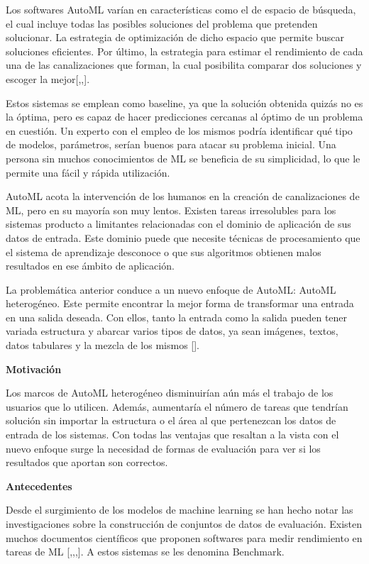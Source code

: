 Los softwares AutoML varían en características como el de espacio de búsqueda, el cual incluye todas las posibles soluciones del problema que pretenden solucionar. 
La estrategia de optimización de dicho espacio que permite buscar soluciones eficientes. Por último, la estrategia para estimar el rendimiento de cada una de las 
canalizaciones que forman, la cual posibilita comparar dos soluciones y escoger la mejor[\cite{33},\cite{37},\cite{52}].

Estos sistemas se emplean como baseline, ya que la solución obtenida quizás no es la óptima, pero es capaz de hacer predicciones cercanas al óptimo de un 
problema en cuestión. Un experto con el empleo de los mismos podría identificar qué tipo de modelos, parámetros, serían buenos para atacar su problema inicial. 
Una persona sin muchos conocimientos de ML se beneficia de su simplicidad, lo que le permite una fácil y rápida utilización.

AutoML acota la intervención de los humanos en la creación de canalizaciones de ML, pero en su mayoría son muy lentos. Existen tareas irresolubles para los 
sistemas producto a limitantes relacionadas con el dominio de aplicación de sus datos de entrada. Este dominio puede que necesite técnicas de procesamiento que el 
sistema de aprendizaje desconoce o que sus algoritmos obtienen malos resultados en ese ámbito de aplicación.

La problemática anterior conduce a un nuevo enfoque de AutoML: AutoML heterogéneo. Este permite encontrar la mejor forma de transformar una entrada en una 
salida deseada. Con ellos, tanto la entrada como la salida pueden tener variada estructura y abarcar varios tipos de datos, ya sean imágenes, textos, datos 
tabulares y la mezcla de los mismos [\cite{33}].

\begin{flushleft} 
{\Large { \textbf{Motivación} }}
\end{flushleft}
Los marcos de AutoML heterogéneo disminuirían aún más el trabajo de los usuarios que lo utilicen. Además, aumentaría el número de 
tareas que tendrían solución sin importar la estructura o el área al que pertenezcan los datos de entrada de los sistemas. Con todas las ventajas 
que resaltan a la vista con el nuevo enfoque surge la necesidad de formas de evaluación para ver si los resultados que aportan son correctos.


\begin{flushleft} 
    {\Large { \textbf{Antecedentes}}}
\end{flushleft}
Desde el surgimiento de los modelos de machine learning se han hecho notar las investigaciones sobre la construcción de conjuntos de datos de evaluación. 
Existen muchos documentos científicos que proponen softwares para medir rendimiento en tareas de ML [\cite{1},\cite{3},\cite{2},\cite{7}]. A estos sistemas se les 
denomina Benchmark.

